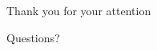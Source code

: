 \documentclass{beamer}
\begin{document}

	\section{}

	\begin{frame}
		\begin{center}
			\Large{Thank you for your attention}
		\end{center}
	\end{frame}

	\begin{frame}
		\begin{center}
			\Large{Questions?}
		\end{center}
	\end{frame}

%
%
%
%
%
	
\end{document}
